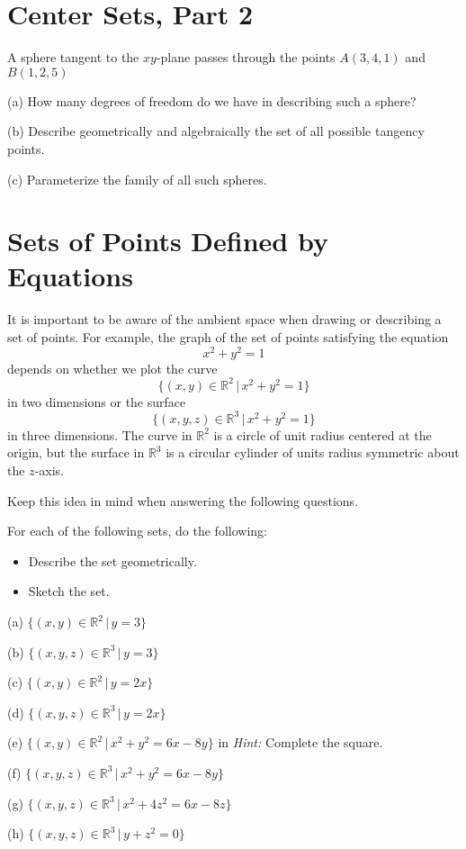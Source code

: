 \documentclass{ximera}
\begin{document}
\section*{Center Sets, Part 2}
A sphere tangent to the $xy$-plane passes through the points $A(3,4,1)$ and $B(1,2,5)$ 

(a) How many degrees of freedom do we have in describing such a sphere?

(b) Describe geometrically and algebraically the set of all possible tangency points.

(c) Parameterize the family of all such spheres.




\section*{Sets of Points Defined by Equations}

It is important to be aware of the ambient space when drawing or describing a set of points. For example, the graph of the set of points satisfying the equation 
\[
    x^2 + y^2 = 1
\]
depends on whether we plot the curve
\[
   \{  (x,y) \in\mathbb{R}^2 \, | \, x^2 + y^2 = 1 \}
\]
in two dimensions or the surface
\[
   \{  (x,y,z) \in\mathbb{R}^3 \, | \, x^2 + y^2 = 1 \}
\]
in three dimensions. The curve in $\mathbb{R}^2$ is a circle of unit radius centered at the origin, but the surface in $\mathbb{R}^3$ is a circular cylinder of units radius symmetric about the $z$-axis.

Keep this idea in mind when answering the following questions.

\begin{question} \label{Q1:Coordinates}
For each of the following sets, do the following:

\begin{itemize}
\item{Describe the set geometrically.}

\item{Sketch the set.}

\end{itemize}

(a) $\{  (x,y)\in \mathbb{R}^2 \, | \, y=3  \}$

(b) $\{  (x,y,z)\in \mathbb{R}^3 \, | \, y=3  \}$

(c) $\{  (x,y)\in \mathbb{R}^2 \, | \, y=2x  \}$

(d) $\{  (x,y,z)\in \mathbb{R}^3 \, | \, y=2x  \}$

(e) $\{  (x,y)\in \mathbb{R}^2 \, | \,  x^2 + y^2 = 6x - 8y  \}$   in {\it Hint:} Complete the square.

(f)  $\{  (x,y,z)\in \mathbb{R}^3 \, | \, x^2 + y^2 = 6x - 8y  \}$

(g) $\{  (x,y,z)\in \mathbb{R}^3 \, | \, x^2 +4z^2 = 6x - 8z  \}$

(h) $\{  (x,y,z)\in \mathbb{R}^3 \, | \, y+z^2= 0  \}$

\end{question}
\end{document}
